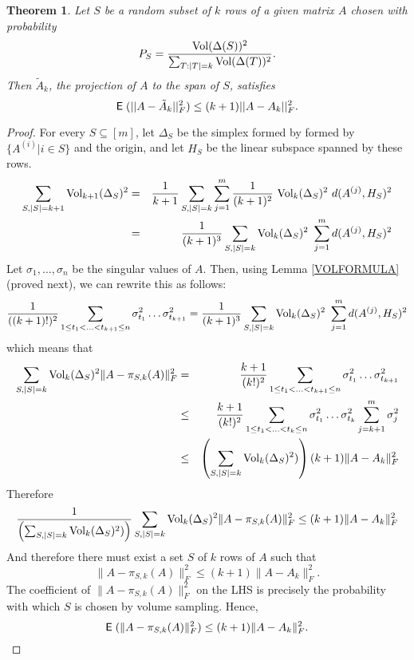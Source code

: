 \documentclass{book}
\newtheorem{theorem}{Theorem}[chapter]
\numberwithin{exercise}{chapter}
\begin{document}
\begin{theorem}\label{KROWS}
Let $S$ be a random subset of $k$ rows of a given matrix $A$
chosen with probability
\[
P_S = \frac{\mbox{Vol}(\Delta(S))^2}{\sum_{T:|T|=k} \mbox{Vol}(\Delta(T))^2}.
\]
Then $\tilde{A}_k$, the projection of $A$ to the span of $S$,
satisfies
\[
\hbox{{\sf E}\;}(||A-\tilde{A}_k||_F^2) \leq (k+1) ||A-A_k||_F^2.
\]
\end{theorem}
\begin{proof}
For every $S \subseteq [m]$, let $\Delta_S$ be the simplex formed
by formed by $\{ A^{(i)} | i \in S \}$ and the origin, and let
$H_S$ be the linear subspace spanned by these rows.
\begin{eqnarray*}
\sum_{S, |S|=k+1} \mbox{Vol}_{k+1} (\Delta_S)^2 &=& \frac{1}{k+1}
\sum_{S, |S|=k} \sum_{j=1}^{m} \frac{1}{(k+1)^2}~ \mbox{Vol}_k
(\Delta_S)^2~ d(A^{(j)}, H_S)^2 \\
&=& \frac{1}{(k+1)^3} \sum_{S, |S|=k} \mbox{Vol}_k (\Delta_S)^2~
\sum_{j=1}^{m} d(A^{(j)}, H_S)^2
\end{eqnarray*}
Let $\sigma_1,\ldots, \sigma_n$ be the singular values of $A$. Then,
using Lemma \ref{VOLFORMULA} (proved next), we can rewrite
this as follows:
\[
\frac{1}{((k+1)!)^2} \sum_{1 \leq t_1 <
\ldots < t_{k+1} \leq n} \sigma_{t_1}^2 \ldots \sigma_{t_{k+1}}^2
= \frac{1}{(k+1)^3} \sum_{S, |S|=k} \mbox{Vol}_k (\Delta_S)^2~
\sum_{j=1}^{m} d(A^{(j)}, H_S)^2 \] which means that
\begin{eqnarray*}
\sum_{S, |S|=k} \mbox{Vol}_k (\Delta_S)^2 \| A - \pi_{S,k} (A) \|_F^2
&=& \frac{k+1}{(k!)^2} \sum_{1 \leq t_1 < \ldots <
t_{k+1} \leq n} \sigma_{t_1}^2 \ldots \sigma_{t_{k+1}}^2 \\
&\leq& \frac{k+1}{(k!)^2} \sum_{1 \leq t_1 < \ldots < t_k \leq n}
\sigma_{t_1}^2 \ldots \sigma_{t_k}^2 \sum_{j=k+1}^{m}
\sigma_j^2 \\
&\leq& \left( \sum_{S, |S|=k} \mbox{Vol}_k (\Delta_S)^2) \right) (k+1)
\| A - A_k \|_F^2
\end{eqnarray*}
Therefore \[ \frac{1}{\left( \sum_{S, |S|=k} \mbox{Vol}_k (\Delta_S)^2)
\right)} \sum_{S, |S|=k} \mbox{Vol}_k (\Delta_S)^2 \| A - \pi_{S,k} (A)
\|_F^2 \leq (k+1) \| A - A_k \|_F^2 \] And therefore there must
exist a set $S$ of $k$ rows of $A$ such that \[ \| A - \pi_{S,k}
(A) \|_F^2 \leq (k+1) \| A - A_k \|_F^2.
\]
The coefficient of $\|A-\pi_{S,k}(A)\|_F^2$ on the LHS is
precisely the probability with which $S$ is chosen by volume
sampling. Hence,
\[
\hbox{{\sf E}\;}(\|A-\pi_{S,k}(A)\|_F^2) \le (k+1)\|A-A_k\|_F^2.
\]
\end{proof}
\end{document}
